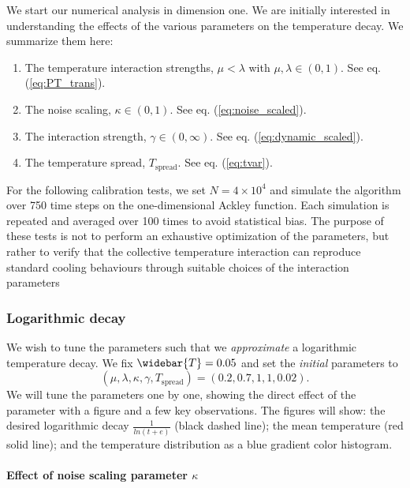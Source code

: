 \documentclass[10pt,a4paper]{article}
\theoremstyle{theorem}
\numberwithin{equation}{section}
\begin{document}
We start our numerical analysis in dimension one. We are initially interested in understanding the effects of the various parameters on the temperature decay. We summarize them here:
\begin{enumerate}
\item The temperature interaction strengths, $\mu<\lambda$ with $\mu,\lambda\in(0,1)$. See eq. (\ref{eq:PT_trans}).

\item The noise scaling, $\kappa\in(0,1)$. See eq. (\ref{eq:noise_scaled}).

\item The interaction strength, $\gamma\in(0,\infty)$. See eq. (\ref{eq:dynamic_scaled}).


\item The temperature spread, $T_{\mathrm{spread}}$. See eq. (\ref{eq:tvar}).

\end{enumerate}
For the following calibration tests, we set $N=4\times 10^4$ and simulate the algorithm over 750 time steps on the one-dimensional Ackley function. Each simulation is repeated and averaged over 100 times to avoid statistical bias. The purpose of these tests is not to perform an exhaustive optimization of the parameters, but rather to verify that the collective temperature interaction can reproduce standard cooling behaviours through suitable choices of the interaction
parameters

\subsubsection{Logarithmic decay}
We wish to tune the parameters such that we \textit{approximate} a logarithmic temperature decay. We fix $\widebar{T}=0.05$ and set the \textit{initial} parameters to 
\begin{equation*}
(\mu,\lambda,\kappa,\gamma,T_{\mathrm{spread}})=(0.2,0.7,1,1,0.02).
\end{equation*}
We will tune the parameters one by one, showing the direct effect of the parameter with a figure and a few key observations. The figures will show: the desired logarithmic decay $\frac{1}{ln(t+e)}$ (black dashed line); the mean temperature (red solid line); and the temperature distribution as a blue gradient color histogram.


\paragraph{Effect of noise scaling parameter $\kappa$}
\end{document}
